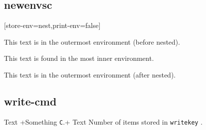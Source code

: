 \documentclass{article}
\begin{document}
\subsection{newenvsc}
[store-env=nest,print-env=false]

\begin{scnest}
This text is in the outermost environment (before nested).
\begin{scnest}[store-env=innernest]
This text is found in the most inner environment.
\end{scnest}
This text is in the outermost environment (after nested).
\end{scnest}

\par
{}

\subsection{write-cmd}
Text
\Scontents*[store-cmd=writekey,write-cmd=writekey2.tsc]+Something  		\verb|C|.+
Text
Number of items stored in  \verb+writekey+ .\par
\par
{}
\end{document}
